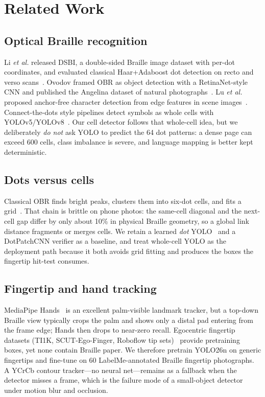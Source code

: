 \documentclass[conference]{IEEEtran}
\begin{document}
\section{Related Work}
\label{sec:related}

\subsection{Optical Braille recognition}
Li \textit{et al.} released DSBI, a double-sided Braille image
dataset with per-dot coordinates, and evaluated classical Haar+Adaboost
dot detection on recto and verso
scans~\cite{li2018dsbi}. Ovodov framed OBR as object detection with a
RetinaNet-style CNN and published the Angelina dataset of natural
photographs~\cite{ovodov2021obr}. Lu \textit{et al.} proposed
anchor-free character detection from edge features in scene
images~\cite{lu2022anchor}. Connect-the-dots style pipelines detect
symbols as whole cells with YOLOv5/YOLOv8~\cite{ahn-dotneuralnet}. Our
cell detector follows that whole-cell idea, but we deliberately
\textit{do not} ask YOLO to predict the 64 dot patterns: a dense page can
exceed 600 cells, class imbalance is severe, and language mapping is
better kept deterministic.

\subsection{Dots versus cells}
Classical OBR finds bright peaks, clusters them into six-dot cells, and
fits a grid~\cite{li2018dsbi}. That chain is brittle on phone photos:
the same-cell diagonal and the next-cell gap differ by only about 10\%
in physical Braille geometry, so a global link distance fragments or
merges cells. We retain a learned \textit{dot} YOLO~\cite{yolo-ultralytics}
and a DotPatchCNN verifier as a baseline, and treat whole-cell YOLO as
the deployment path because it both avoids grid fitting and produces the
boxes the fingertip hit-test consumes.

\subsection{Fingertip and hand tracking}
MediaPipe Hands~\cite{mediapipe-hands} is an excellent palm-visible
landmark tracker, but a top-down Braille view typically crops the palm
and shows only a distal pad entering from the frame edge; Hands then
drops to near-zero recall. Egocentric fingertip datasets (TI1K,
SCUT-Ego-Finger, Roboflow tip sets)~\cite{ti1k} provide pretraining
boxes, yet none contain Braille paper. We therefore pretrain YOLO26n on
generic fingertips and fine-tune on 60 LabelMe-annotated Braille
fingertip photographs. A YCrCb contour tracker---no neural net---remains
as a fallback when the detector misses a frame, which is the failure
mode of a small-object detector under motion blur and occlusion.
\end{document}
